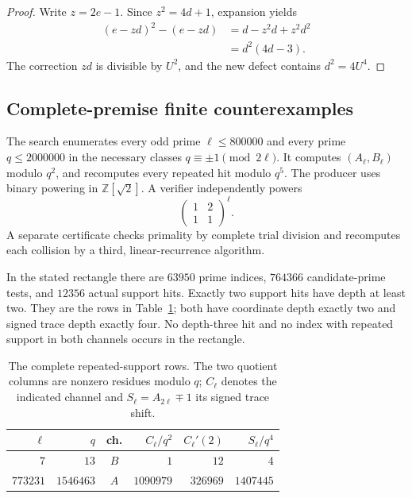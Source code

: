 \begin{proof}
Write $z=2e-1$.  Since $z^2=4d+1$, expansion yields
\[
\begin{aligned}
 (e-zd)^2-(e-zd)
 &=d-z^2d+z^2d^2\\
 &=d^2(4d-3).
\end{aligned}
\]
The correction $zd$ is divisible by $U^2$, and the new defect contains
$d^2=4U^4$.
\end{proof}

\subsection{Complete-premise finite counterexamples}

The search enumerates every odd prime $\ell\leq800000$ and every prime
$q\leq2000000$ in the necessary classes
$q\equiv\pm1\pmod{2\ell}$.  It computes $(A_\ell,B_\ell)$ modulo $q^2$,
and recomputes every repeated hit modulo $q^5$.  The producer uses binary
powering in $\mathbb Z[\sqrt2]$.  A verifier independently powers
\[
 \begin{pmatrix}1&2\\1&1\end{pmatrix}^{\ell}.
\]
A separate certificate checks primality by complete trial division and
recomputes each collision by a third, linear-recurrence algorithm.

\begin{proposition}\label{prop:pell-signed-search}
In the stated rectangle there are $63950$ prime indices, $764366$
candidate-prime tests, and $12356$ actual support hits.  Exactly two
support hits have depth at least two.  They are the rows in
Table~\ref{tab:pell-signed-hits}; both have coordinate depth exactly two and signed
trace depth exactly four.  No depth-three hit and no index with repeated
support in both channels occurs in the rectangle.
\end{proposition}

\begin{table}[ht]
\centering
\caption{The complete repeated-support rows.  The two quotient columns are
nonzero residues modulo $q$; $C_\ell$ denotes the indicated channel and
$S_\ell=A_{2\ell}\mp1$ its signed trace shift.}
\label{tab:pell-signed-hits}
\small
\begin{tabular}{rrcrrr}
\toprule
$\ell$ & $q$ & ch. & $C_\ell/q^2$
& $C_\ell'(2)$ & $S_\ell/q^4$\\
\midrule
$7$ & $13$ & $B$ & $1$ & $12$ & $4$\\
$773231$ & $1546463$ & $A$ & $1090979$ & $326969$ & $1407445$\\
\bottomrule
\end{tabular}
\end{table}

